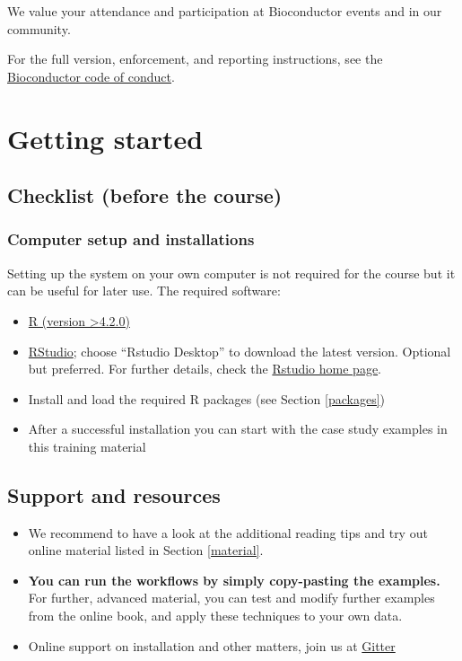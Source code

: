 \documentclass[
  oneside]{book}
\begin{document}
We value your attendance and participation at Bioconductor events and in our community.

For the full version, enforcement, and reporting instructions, see the \href{https://bioconductor.github.io/bioc_coc_multilingual/}{Bioconductor code of conduct}.

\hypertarget{start}{%
\chapter{Getting started}\label{start}}

\hypertarget{checklist-before-the-course}{%
\section{Checklist (before the course)}\label{checklist-before-the-course}}

\hypertarget{computer-setup-and-installations}{%
\subsection{Computer setup and installations}\label{computer-setup-and-installations}}

Setting up the system on your own computer is not required for the
course but it can be useful for later use. The required software:

\begin{itemize}
\item
  \href{https://www.r-project.org/}{R (version \textgreater4.2.0)}
\item
  \href{https://www.rstudio.com/products/rstudio/download/}{RStudio};
  choose ``Rstudio Desktop'' to download the latest version. Optional
  but preferred. For further details, check the \href{https://www.rstudio.com/}{Rstudio home
  page}.
\item
  Install and load the required R packages (see Section \ref{packages})
\item
  After a successful installation you can start with the
  case study examples in this training material
\end{itemize}

\hypertarget{support-and-resources}{%
\section{Support and resources}\label{support-and-resources}}

\begin{itemize}
\item
  We recommend to have a look at the additional reading tips and try out online material listed in Section \ref{material}.
\item
  \textbf{You can run the workflows by simply copy-pasting the examples.}
  For further, advanced material, you can test and modify further
  examples from the online book, and apply these techniques to your own
  data.
\item
  Online support on installation and other matters, join us at \href{https://gitter.im/microbiome/miaverse?utm_source=badge\&utm_medium=badge\&utm_campaign=pr-badge\&utm_content=badge}{Gitter}
\end{itemize}
\end{document}
